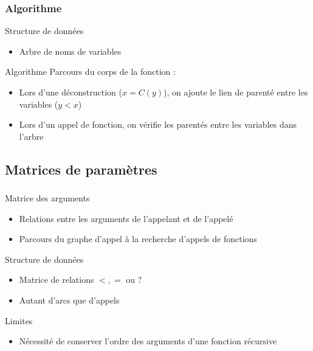\begin{frame}
  \frametitle{Algorithme}
  \begin{block}{Structure de données}
    \begin{itemize}
    \item Arbre de noms de variables
    \end{itemize}
  \end{block}
  \begin{block}{Algorithme}
    Parcours du corps de la fonction :
    \begin{itemize}
      \item Lors d'une déconstruction ($x = C(y)$), on ajoute le lien de parenté entre les variables ($y < x$)
      \item Lors d'un appel de fonction, on vérifie les parentés entre les variables dans l'arbre
    \end{itemize}
  \end{block}
\end{frame}

\subsection{Matrices de paramètres}

\begin{frame}
  \frametitle{}
  \begin{block}{Matrice des arguments}
    \begin{itemize}
      \item Relations entre les arguments de l'appelant et de l'appelé
      \item Parcours du graphe d'appel à la recherche d'appels de fonctions
    \end{itemize}
  \end{block}
  \begin{block}{Structure de données}
    \begin{itemize}
    \item Matrice de relations $<, =$ ou $?$
    \item Autant d'arcs que d'appels
    \end{itemize}
  \end{block}
  \begin{block}{Limites}
    \begin{itemize}
      \item Nécessité de conserver l'ordre des arguments d'une fonction récursive
    \end{itemize}
  \end{block}
\end{frame}

